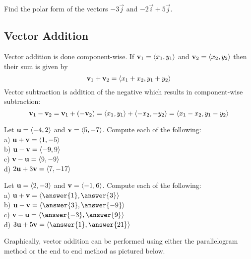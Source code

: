 \documentclass[handout]{ximera}
\begin{document}
\begin{problem}
Find the polar form of the vectors $-3\vec{j}$ and $-2\vec{i}+5\vec{j}$.\\
\end{problem}

\subsection{Vector Addition}
Vector addition is done component-wise.  If $\mathbf{v}_1 = \left\langle x_1, y_1\right\rangle$ and $\mathbf{v}_2 = \left\langle x_2, y_2\right\rangle$
then their sum is given by
\[
\mathbf{v}_1+ \mathbf{v}_2= \left\langle x_1+x_2,  y_1+y_2\right\rangle
\]
Vector subtraction is addition of the negative which results in component-wise subtraction:
\[
\mathbf{v}_1- \mathbf{v}_2= \mathbf{v}_1+ \left(- \mathbf{v}_2\right)  = \left\langle x_1,y_1\right\rangle + \left\langle -x_2, -y_2\right\rangle = \left\langle x_1-x_2,  y_1-y_2\right\rangle
\]

\begin{example}
Let $\mathbf{u} = \left\langle -4, 2\right\rangle$ and $\mathbf{v} = \left\langle 5, -7\right\rangle$.  Compute each of the following:\\
a) $\mathbf{u}+\mathbf{v} = \left\langle 1, -5\right\rangle$\\
b) $\mathbf{u}-\mathbf{v} = \left\langle -9, 9\right\rangle$\\
c) $\mathbf{v}-\mathbf{u} = \left\langle 9, -9\right\rangle$\\
d) $2\mathbf{u}+3\mathbf{v} = \left\langle 7, -17\right\rangle$\\
\end{example}

\begin{problem}
Let $\mathbf{u} = \left\langle 2, -3\right\rangle$ and $\mathbf{v} = \left\langle -1, 6\right\rangle$.  Compute each of the following:\\
a) $\vec{u}+\vec{v} = \vector{\answer{1}, \answer{3}}$\\
b) $\vec{u}-\vec{v} = \vector{\answer{3}, \answer{-9}}$\\
c) $\vec{v}-\vec{u} = \vector{\answer{-3}, \answer{9}}$\\
d) $3\vec{u}+5\vec{v} = \vector{\answer{1}, \answer{21}}$\\
\end{problem}

Graphically, vector addition can be performed using either the parallelogram method or the end to end method as pictured below.
\begin{image}
\end{image}
\end{document}
